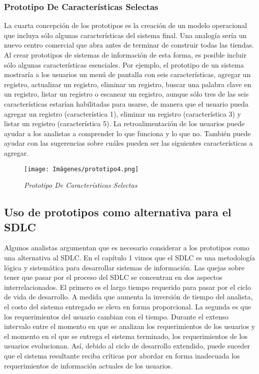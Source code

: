 \subsubsection{Prototipo De Características Selectas }
La cuarta concepción de los prototipos es la creación de un modelo operacional que incluya sólo algunas características del sistema final. Una analogía sería un nuevo centro comercial que abra antes de terminar de construir todas las tiendas. Al crear prototipos de sistemas de información de esta forma, es posible incluir sólo algunas características esenciales. Por ejemplo, el prototipo de un sistema mostraría a los usuarios un menú de pantalla con seis características, agregar un registro, actualizar un registro, eliminar un registro, buscar una palabra clave en un registro, listar un registro o escanear un registro, aunque sólo tres de las seis características estarían habilitadas para usarse, de manera que el usuario pueda agregar un registro (característica 1), eliminar un registro (característica 3) y listar un registro (característica 5). La retroalimentación de los usuarios puede ayudar a los analistas a comprender lo que funciona y lo que no. También puede ayudar con las sugerencias sobre cuáles pueden ser las siguientes características a agregar.

\begin{figure}[h!]
    \centering
    \texttt{[image: Imágenes/prototipo4.png]}
    \caption{\textit{Prototipo De Características Selectas}}
    \label{exemploLabel}
    \end{figure}
    
    
\subsection{Uso de prototipos como alternativa para el SDLC }
Algunos analistas argumentan que es necesario considerar a los prototipos como una alternativa al SDLC. En el capítulo 1 vimos que el SDLC es una metodología lógica y sistemática para desarrollar sistemas de información. Las quejas sobre tener que pasar por el proceso del SDLC se concentran en dos aspectos interrelacionados. El primero es el largo tiempo requerido para pasar por el ciclo de vida de desarrollo. A medida que aumenta la inversión de tiempo del analista, el costo del sistema entregado se eleva en forma proporcional. La segunda es que los requerimientos del usuario cambian con el tiempo. Durante el extenso intervalo entre el momento en que se analizan los requerimientos de los usuarios y el momento en el que se entrega el sistema terminado, los requerimientos de los usuarios evolucionan. Así, debido al ciclo de desarrollo extendido, puede suceder que el sistema resultante reciba críticas por abordar en forma inadecuada los requerimientos de información actuales de los usuarios.



